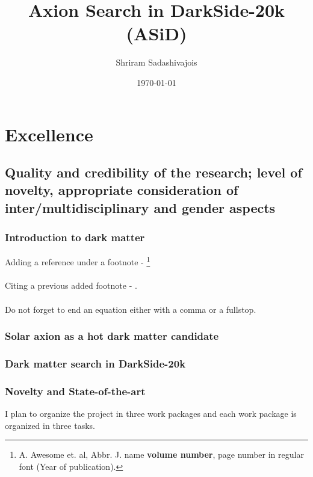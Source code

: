 \documentclass[a4paper,11pt]{extarticle}
\title{Axion Search in DarkSide-20k (ASiD)}
\author{Shriram Sadashivajois}
\date{\today}
\begin{document}

\section{Excellence}
\subsection{Quality and credibility of the research; level of novelty, appropriate consideration of inter/multidisciplinary and gender aspects}
\subsubsection{Introduction to dark matter}
Adding a reference under a footnote - \footnote{A. Awesome et. al, Abbr. J. name \textbf{volume number}, page number in regular font (Year of publication).\label{footnote1}} 
\\ \\
Citing a previous added footnote - .
\\ \\
Do not forget to end an equation either with a comma or a fullstop.

\subsubsection{Solar axion as a hot dark matter candidate}
\subsubsection{Dark matter search in DarkSide-20k}
\subsubsection{Novelty and State-of-the-art}
I plan to organize the project in three work packages and each work package is organized in three tasks.
\end{document}
